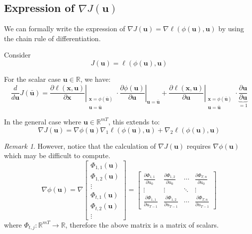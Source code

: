 \documentclass[openany]{book}
\newcommand{\R}{\mathbb{R}}               %
\theoremstyle{definition}
\theoremstyle{remark}
\newtheorem*{remark}{Remark}
\begin{document}
\subsection{Expression of \texorpdfstring{$\nabla J(\mathbf{u})$}{Expression of the gradient of J(u)}}
We can formally write the expression of $\nabla J(\mathbf{u}) = \nabla \ell(\phi(\mathbf{u}), \mathbf{u})$ by using the chain rule of differentiation.

Consider
\[
    J(\mathbf{u}) = \ell(\phi(\mathbf{u}), \mathbf{u})
\]

For the scalar case $\mathbf{u} \in \mathbb{R}$, we have:
\[
    \frac{d}{d\mathbf{u}}J(\bar{\mathbf{u}}) = \left.\frac{\partial \ell(\mathbf{x}, \mathbf{u})}{\partial \mathbf{x}}\right|_{\substack{\mathbf{x}=\phi(\bar{\mathbf{u}})\\ \mathbf{u}=\bar{\mathbf{u}}}} \cdot \left.\frac{\partial \phi(\mathbf{u})}{\partial \mathbf{u}}\right|_{\mathbf{u}=\bar{\mathbf{u}}} + \left.\frac{\partial \ell(\mathbf{x}, \mathbf{u})}{\partial \mathbf{u}}\right|_{\substack{\mathbf{x}=\phi(\bar{\mathbf{u}})\\ \mathbf{u}=\bar{\mathbf{u}}}} \cdot \underbrace{\frac{\partial \mathbf{u}}{\partial \mathbf{u}}}_{=1}
\]

In the general case where $\mathbf{u} \in \mathbb{R}^{mT}$, this extends to:
\[
    \nabla J(\mathbf{u}) = \nabla\phi(\mathbf{u})\nabla_1\ell(\phi(\mathbf{u}), \mathbf{u}) + \nabla_2\ell(\phi(\mathbf{u}), \mathbf{u})
\]

\begin{remark}
However, notice that the calculation of $\nabla J(\mathbf{u})$ requires $\nabla\phi(\mathbf{u})$ which may be difficult to compute.
\[
    \nabla\phi(\mathbf{u}) = \nabla \begin{bmatrix}
        \Phi_{1,1}(\mathbf{u})\\
        \Phi_{1,2}(\mathbf{u})\\
        \vdots \\
        \Phi_{t,1}(\mathbf{u})\\
        \Phi_{t,2}(\mathbf{u})\\
        \vdots
    \end{bmatrix}
= \begin{bmatrix}
        \displaystyle\frac{\partial \Phi_{1,1}}{\partial u_0} & \displaystyle\frac{\partial \Phi_{1,2}}{\partial u_0} & \cdots & \displaystyle\frac{\partial \Phi_{T,n}}{\partial u_0}\\
        \vdots & \vdots & \ddots & \vdots \\
        \displaystyle\frac{\partial \Phi_{1,1}}{\partial u_{T-1}} & \displaystyle\frac{\partial \Phi_{1,2}}{\partial u_{T-1}} &\cdots & \displaystyle\frac{\partial \Phi_{T,n}}{\partial u_{T-1}}
    \end{bmatrix}
\]
where $\Phi_{t,j}:\R^{mT}\to \R$, therefore the above matrix is a matrix of scalars.
\end{remark}
\end{document}
